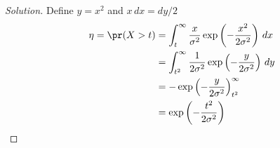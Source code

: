 \begin{proof}[Solution]
    Define $y = x^2$ and $x \, dx = dy/2$
    \begin{equation*}
        \begin{split}
            \eta = \pr(X > t) &= \int_{t}^{\infty} \frac{x}{\sigma^2}\exp\left(-\frac{x^2}{2\sigma^2}\right)\, dx \\
            &= \int_{t^2}^{\infty} \frac{1}{2\sigma^2}\exp\left(-\frac{y}{2\sigma^2}\right) \, dy \\
            &= -\exp\left(-\frac{y}{2\sigma^2}\right)_{t^2}^{\infty} \\
            &= \exp\left(-\frac{t^2}{2\sigma^2}\right)
        \end{split}
    \end{equation*}
\end{proof}
